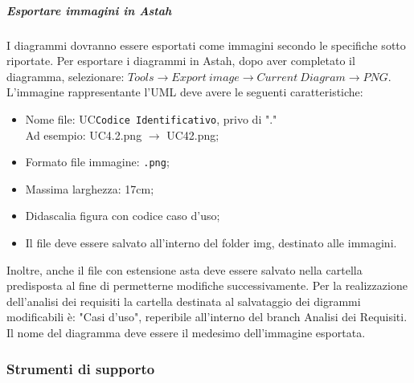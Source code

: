 \subparagraph{Esportare immagini in Astah}
I diagrammi dovranno essere esportati come immagini secondo le specifiche sotto riportate. Per esportare i diagrammi in Astah, dopo aver completato il diagramma, selezionare: $Tools \rightarrow Export\ image \rightarrow Current\ Diagram \rightarrow PNG$.
L'immagine rappresentante l'UML deve avere le seguenti caratteristiche:
\begin{itemize}
\item Nome file: UC\texttt{Codice Identificativo}, privo di "."\\
Ad esempio: UC4.2.png $\rightarrow$ UC42.png;
\item Formato file immagine: \texttt{.png};
\item Massima larghezza: 17cm;
\item Didascalia figura con codice caso d'uso;
\item Il file deve essere salvato all'interno del folder img, destinato alle immagini.
\end{itemize}
Inoltre, anche il file con estensione asta deve essere salvato nella cartella predisposta al fine di permetterne modifiche successivamente. 
Per la realizzazione dell'analisi dei requisiti la cartella destinata al salvataggio dei digrammi modificabili è: "Casi d'uso", reperibile all'interno del {branch} Analisi dei Requisiti. Il nome del diagramma deve essere il medesimo dell'immagine esportata.

\subsubsection{Strumenti di supporto}

